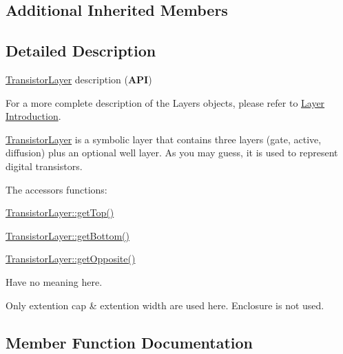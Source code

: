 \subsection*{Additional Inherited Members}


\subsection{Detailed Description}
\hyperlink{classHurricane_1_1TransistorLayer}{Transistor\+Layer} description ({\bfseries A\+PI}) 

For a more complete description of the Layers objects, please refer to \hyperlink{classHurricane_1_1Layer_secLayerIntro}{Layer Introduction}.

\hyperlink{classHurricane_1_1TransistorLayer}{Transistor\+Layer} is a symbolic layer that contains three layers (gate, active, diffusion) plus an optional well layer. As you may guess, it is used to represent digital transistors.

The accessors functions\+: 
\begin{DoxyItemize}
\item \hyperlink{classHurricane_1_1Layer_a5f7c43a29f3dd02a9ebccbcbf91d6727}{Transistor\+Layer\+::get\+Top()} 
\item \hyperlink{classHurricane_1_1Layer_a4dab4552a219d2d900ed0b1245dc6580}{Transistor\+Layer\+::get\+Bottom()} 
\item \hyperlink{classHurricane_1_1Layer_a69e76c09a56260169c4f5c145a35a47f}{Transistor\+Layer\+::get\+Opposite()} 
\end{DoxyItemize}Have no meaning here.

Only extention cap \& extention width are used here. Enclosure is not used. 

\subsection{Member Function Documentation}
\mbox{\label{classHurricane_1_1TransistorLayer_ac34a9a0c5056f1f483b670a1e929ed93}} 
